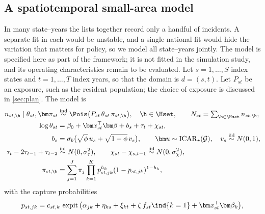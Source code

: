 \subsection{A spatiotemporal small-area model}\label{sec:models-sae}

In many state--years the lists together record only a handful of incidents. A separate fit in each would be unstable, and a single national fit would hide the variation that matters for policy, so we model all state--years jointly. The model is specified here as part of the framework; it is not fitted in the simulation study, and its operating characteristics remain to be evaluated. Let $s=1,\dots,S$ index states and $t=1,\dots,T$ index years, so that the domain is $d=(s,t)$. Let $P_{st}$ be an exposure, such as the resident population; the choice of exposure is discussed in \cref{sec:plan}. The model is
\begin{equation}\label{eq:smallarea}
\begin{aligned}
  n_{st,\h}\mid\theta_{st},\bm\pi_{st}
    &\overset{\text{ind}}{\sim}\Pois\big(P_{st}\,\theta_{st}\,\pi_{st,\h}\big),\quad \h\in\Hset,
  \qquad N_{st}=\textstyle\sum_{\h\in\Hset}n_{st,\h},\\
  \log\theta_{st}&=\beta_0+\bm x_{st}^{\top}\bm\beta+b_s+\tau_t+\chi_{st},\\
  b_s&=\sigma_b\big(\sqrt{\phi}\,u_s+\sqrt{1-\phi}\,v_s\big),
  \qquad \bm u\sim\mathrm{ICAR}_\star(\mathcal G),\quad v_s\overset{\text{iid}}{\sim}N(0,1),\\
  \tau_t-2\tau_{t-1}+\tau_{t-2}&\overset{\text{iid}}{\sim}N(0,\sigma_\tau^2),
  \qquad \chi_{st}-\chi_{s,t-1}\overset{\text{iid}}{\sim}N(0,\sigma_\chi^2),\\
  \pi_{st,\h}&=\sum_{j=1}^{J}\pi_j\prod_{k=1}^{K}p_{st,jk}^{h_k}(1-p_{st,jk})^{1-h_k},
\end{aligned}
\end{equation}
with the capture probabilities
\begin{equation}\label{eq:models-capture}
  p_{st,jk}=c_{st,k}\,\operatorname{expit}\big(\alpha_{jk}+\eta_{ks}+\xi_{kt}+\zeta\,f_{st}\ind{k=1}+\bm x_{st}^{\top}\bm\beta_k\big),
\end{equation}
